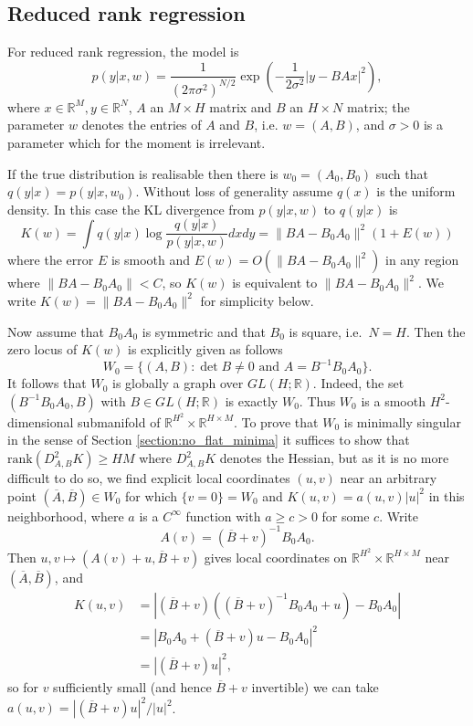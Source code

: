 \documentclass[11pt]{article}
\numberwithin{equation}{section}
\theoremstyle{plain}
\theoremstyle{definition}
\begin{document}
\subsection{Reduced rank regression} \label{appendix:reducedrank}
For reduced rank regression, the model is
$$
p( y \rvert x, w) = \frac{1}{(2\pi \sigma^2)^{N/2}} \exp\left( -
\frac{1}{2 \sigma^2} | y - BA x|^2\right),
$$
where $x \in \mathbb{R}^M, y \in \mathbb{R}^N$, $A$ an $M \times H$
matrix and $B$ an $H \times N$ matrix; the parameter $w$ denotes the
entries of $A$ and $B$, i.e. $w = (A, B)$, and $\sigma > 0$ is a
parameter which for the moment is irrelevant.

If the true distribution is realisable then there is $w_0 = (A_0,
B_0)$ such that $q(y|x) = p(y \rvert x, w_0)$.  Without loss of generality assume $q(x)$ is the uniform density. In this case the KL
divergence from $p(y \rvert x, w)$ to $q(y|x)$ is
$$
K(w) = \int q(y|x) \log \frac{q(y|x)}{p(y|x, w)} dxdy = \| BA -
B_0A_0 \|^2 \left( 1 + E(w) \right)
$$
where the error $E$ is smooth and $E(w) = O(\| BA -
B_0A_0 \|^2)$ in any region where $\| BA -
B_0A_0 \| < C$, so $K(w)$ is equivalent to $\|BA - B_0 A_0\|^2$.  We
write $K(w) = \|BA - B_0 A_0\|^2$ for simplicity below.

Now assume that $B_0A_0$ is symmetric and that $B_0$ is square,
i.e.\ $N = H$.  Then the zero locus of $K(w)$ is explicitly given as
follows
$$
W_0 = \{ (A, B) : \det B \neq 0 \mbox{ and } A = B^{-1}B_0A_0 \}.
$$
It follows that $W_0$ is globally a graph over $GL(H;
\mathbb{R})$.  Indeed, the set $(B^{-1}B_0 A_0, B)$ with $B \in GL(H;
\mathbb{R})$ is exactly $W_0$.  Thus $W_0$ is a smooth
$H^2$-dimensional submanifold of $\mathbb{R}^{H^2} \times
\mathbb{R}^{H \times M}$. To prove that $W_0$ is minimally singular in the sense of Section \ref{section:no_flat_minima} it suffices to show that $\mathrm{rank} ( D^2_{A,B}K) \ge HM$ where $D^2_{A,B} K$ denotes the Hessian, but as it is no more difficult to do so, we find explicit local
coordinates $(u, v)$ near an arbitrary point $(\overline{A},
\overline{B}) \in W_0$ for which $\{ v = 0 \} = W_0$
and $K(u, v) = a(u,v)|u|^2$ in this neighborhood, where $a$ is a
$C^\infty$ function with $a \ge c > 0$ for some $c$.  Write
$$
A(v) = (\overline{B} + v)^{-1}B_0 A_0.
$$
Then $u, v \mapsto (A(v) + u, \overline{B} + v)$ gives local
coordinates on $\mathbb{R}^{H^2} \times
\mathbb{R}^{H \times M}$ near $(\overline{A}, \overline{B})$, and
\begin{equation*}
	\begin{split}
		K(u, v) &= | (\overline{B} + v)( (\overline{B} + v)^{-1}B_0 A_0 + u) -
		B_0 A_0 | \\
		&= | B_0 A_0 +  (\overline{B} + v) u -
		B_0 A_0 |^2 \\
		&= | (\overline{B} + v) u |^2,
	\end{split}
\end{equation*}
so for $v$ sufficiently small (and hence $\overline{B} + v$
invertible) we can take $a(u,v) = | (\overline{B} + v) u |^2 /
|u|^2$.  
\end{document}
